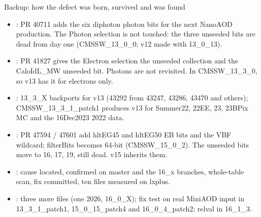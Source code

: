 \begin{frame}{Backup: how the defect was born, survived and was found}
  \begin{itemize}\small
    \item {}: PR 40711 adds the six diphoton photon bits for the next NanoAOD production. The Photon
          selection is not touched: the three unseeded bits are dead from day one (CMSSW\_13\_0\_0; v12 made with 13\_0\_13).
    \item {}: PR 41827 gives the Electron selection the unseeded collection and the CaloIdL\_MW
          unseeded bit. Photons are not revisited. In CMSSW\_13\_3\_0, so v13 has it for electrons only.
    \item {}: 13\_3\_X backports for v13 (43292 from 43247, 43286, 43470 and others);
          CMSSW\_13\_3\_1\_patch1 produces v13 for Summer22, 22EE, 23, 23BPix MC and the 16Dec2023 2022 data.
    \item {}: PR 47594 / 47601 add hltEG45 and hltEG50 EB bits and the VBF wildcard; filterBits
          becomes 64-bit (CMSSW\_15\_0\_2). The unseeded bits move to 16, 17, 19, still dead. v15 inherits them.
    \item {}: cause located, confirmed on master and the 16\_x branches, whole-table scan, fix committed,
          ten files measured on lxplus.
    \item {}: three more files (one 2026, 16\_0\_X); fix test on real MiniAOD input in 13\_3\_1\_patch1,
          15\_0\_15\_patch4 and 16\_0\_4\_patch2; relval in 16\_1\_3.
  \end{itemize}
\end{frame}

